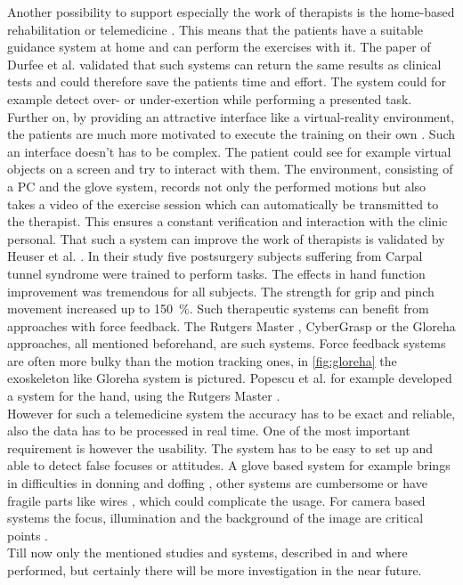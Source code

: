 Another possibility to support especially the work of therapists is the home-based rehabilitation or telemedicine \cite{metcalf2013markerless}. This means that the patients have a suitable guidance system at home and can perform the exercises with it. The paper of Durfee et al. \cite{durfee2007technical} validated that such systems can return the same results as clinical tests and could therefore save the patients time and effort. The system could for example detect over- or under-exertion while performing a presented task. Further on, by providing an attractive interface like a virtual-reality environment, the patients are much more motivated to execute the training on their own \cite{popescu2000virtual}. Such an interface doesn't has to be complex. The patient could see for example virtual objects on a screen and try to interact with them. The environment, consisting of a PC and the glove system, records not only the performed motions but also takes a video of the exercise session which can automatically be transmitted to the therapist. This ensures a constant verification and interaction with the clinic personal. That such a system can improve the work of therapists is validated by Heuser et al. \cite{heuser2007telerehabilitation}. In their study five postsurgery subjects suffering from Carpal tunnel syndrome were trained to perform tasks. The effects in hand function improvement was tremendous for all subjects. The strength for grip and pinch movement increased up to \SI{150}{\percent}. Such therapeutic systems can benefit from approaches with force feedback. The Rutgers Master , CyberGrasp or the Gloreha approaches, all mentioned beforehand, are such systems. Force feedback systems are often more bulky than the motion tracking ones, in \ref{fig:gloreha} the exoskeleton like Gloreha system is pictured. Popescu et al. \cite{popescu2000virtual} for example developed a system for the hand, using the Rutgers Master .\\ 
However for such a telemedicine system the accuracy has to be exact and reliable, also the data has to be processed in real time. One of the most important requirement is however the usability. The system has to be easy to set up and able to detect false focuses or attitudes. A glove based system for example brings in difficulties in donning and doffing \cite{metcalf2013markerless}, other systems are cumbersome or have fragile parts like wires \cite{bouzit2002rutgers}, which could complicate the usage. For camera based systems the focus, illumination and the background of the image are critical points \cite{ionescu2005dynamic}.\\
Till now only the mentioned studies and systems, described in \cite{heuser2007telerehabilitation} and \cite{popescu2000virtual} where performed, but certainly there will be more investigation in the near future.



